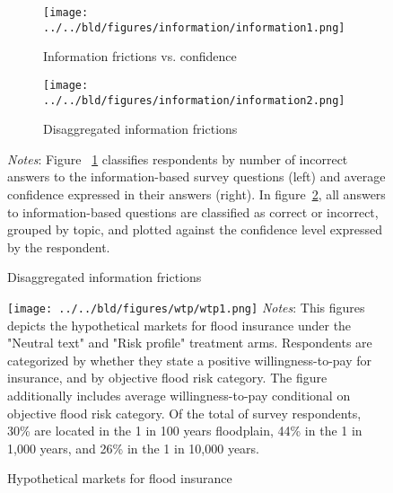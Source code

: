 \begin{figure}
     \centering
     \caption{Information frictions}
     \begin{subfigure}[b]{\linewidth}
         \centering
        \caption{Information frictions vs. confidence}
         \texttt{[image: ../../bld/figures/information/information1.png]}
         \label{fig:aggregated}
     \end{subfigure}
     \hfill
     \begin{subfigure}[b]{\linewidth}
         \centering
         \caption{Disaggregated information frictions}
         \texttt{[image: ../../bld/figures/information/information2.png]}
         \label{fig:disaggregated}
     \end{subfigure}
    \label{fig:information-frictions}
\justifying
\footnotesize \textit{Notes}: Figure ~\ref{fig:aggregated} classifies respondents by number of incorrect answers to the information-based survey questions (left) and average confidence expressed in their answers (right). In figure~\ref{fig:disaggregated}, all answers to information-based questions are classified as correct or incorrect, grouped by topic, and plotted against the confidence level expressed by the respondent.
\end{figure}

\clearpage 



\clearpage



\clearpage



\clearpage 

\begin{figure}[!t]
    \centering
    \caption{Hypothetical markets for flood insurance}
    \texttt{[image: ../../bld/figures/wtp/wtp1.png]}
    \label{fig:wtp}
\justifying
\footnotesize \textit{Notes}: This figures depicts the hypothetical markets for flood insurance under the "Neutral text" and "Risk profile" treatment arms. Respondents are categorized by whether they state a positive willingness-to-pay for insurance, and by objective flood risk category. The figure additionally includes average willingness-to-pay conditional on objective flood risk category. Of the total of survey respondents, 30\% are located in the 1 in 100 years floodplain, 44\% in the 1 in 1,000 years, and 26\% in the 1 in 10,000 years.  
\end{figure}


